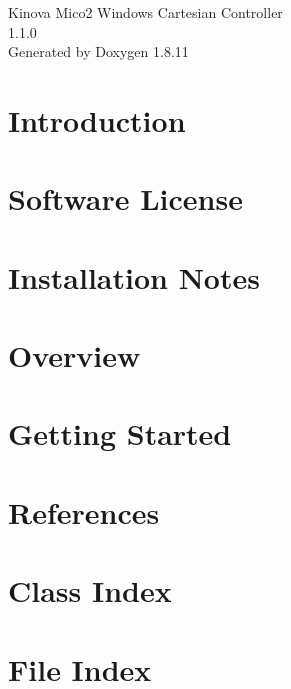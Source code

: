 \documentclass[twoside]{book}
\newcommand{\+}{\discretionary{\mbox{\scriptsize$\hookleftarrow$}}{}{}}
\newcommand{\clearemptydoublepage}{%
  \newpage{\pagestyle{empty}\cleardoublepage}%
}
\begin{document}
\hypersetup{pageanchor=false,
             bookmarksnumbered=true,
             pdfencoding=unicode
            }
\begin{titlepage}
\vspace*{7cm}
\begin{center}%
{\Large Kinova Mico2 Windows Cartesian Controller \\[1ex]\large 1.\+1.\+0 }\\
\vspace*{1cm}
{\large Generated by Doxygen 1.8.11}\\
\end{center}
\end{titlepage}
\clearemptydoublepage
\tableofcontents
\clearemptydoublepage
{}
\hypersetup{pageanchor=true}

\chapter{Introduction}
\label{index}\hypertarget{index}{}
\chapter{Software License}
\label{license}
\hypertarget{license}{}

\chapter{Installation Notes}
\label{install}
\hypertarget{install}{}

\chapter{Overview}
\label{overview}
\hypertarget{overview}{}

\chapter{Getting Started}
\label{gettingstarted}
\hypertarget{gettingstarted}{}

\chapter{References}
\label{references}
\hypertarget{references}{}

\chapter{Class Index}

\chapter{File Index}

\end{document}
